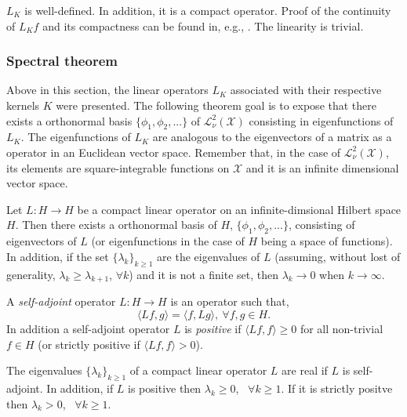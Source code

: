 \begin{remark} \label{remark_LKwelldefinedandcompact}
  $L_{K}$ is well-defined. In addition, it is a compact operator. Proof of the continuity of $L_{K}f$ and its compactness can be found in, e.g., \textcite{cucker2001}. The linearity is trivial.   
\end{remark}


\subsubsection{Spectral theorem} \label{sec_spectralTheorem}

Above in this section, the linear operators $L_{K}$ associated with their respective kernels $K$ were presented. The following theorem goal is to expose that there exists a orthonormal basis $\{\phi_1,\phi_2,...\}$ of $\mathcal{L}^2_{\nu}(\mathcal{X})$ consisting in eigenfunctions of $L_{K}$. The eigenfunctions of $L_{K}$ are analogous to the eigenvectors of a matrix as a operator in an Euclidean vector space. Remember that, in the case of $\mathcal{L}^2_{\nu}(\mathcal{X})$, its elements are square-integrable functions on $\mathcal{X}$ and it is an infinite dimensional vector space.

\begin{theorem} \label{theorem_spectral}
  Let $L: H \to H$ be a compact linear operator on an infinite\hyp{}dimsional Hilbert space $H$. Then there exists a orthonormal basis of $H$, $\{\phi_1,\phi_2,...\}$, consisting of eigenvectors of $L$ (or eigenfunctions in the case of $H$ being a space of functions). In addition, if the set $\{\lambda_k\}_{k \geq 1}$ are the eigenvalues of $L$ (assuming, without lost of generality, $\lambda_k \geq \lambda_{k+1}$, $\forall k$) and it is not a finite set, then $\lambda_k \to 0$ when $k \to \infty$.
\end{theorem}

A \emph{self-adjoint} operator $L: H \to H$ is an operator such that,
\begin{equation*}
  \langle Lf,g\rangle  = \langle f,Lg\rangle , \ \forall f, g \in H.
\end{equation*}
In addition a self-adjoint operator $L$ is \emph{positive} if $\langle Lf,f \rangle \geq 0$ for all non-trivial $f \in H$ (or strictly positive if $\langle Lf,f\rangle  >  0$).  

\begin{proposition} \label{prop_eigenRealAndPositive}
  The eigenvalues $\{\lambda_k\}_{k \geq 1}$ of a compact linear operator $L$ are real if $L$ is self-adjoint. In addition, if $L$ is positive then $\lambda_k \geq 0$, \ $\forall k \geq 1$. If it is strictly positve then $\lambda_k > 0$, \ $\forall k \geq 1$.
\end{proposition}


